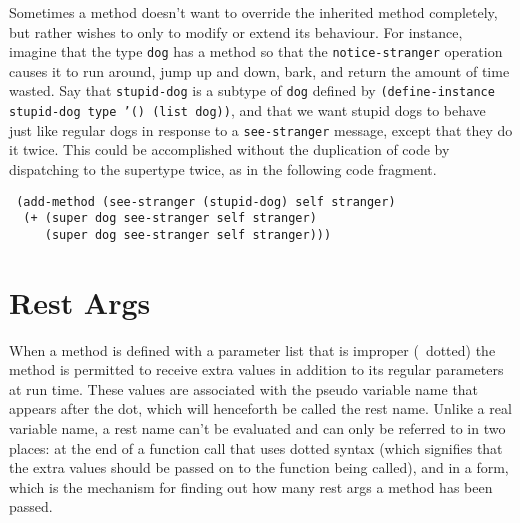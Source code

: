 Sometimes a method doesn't want to override the inherited method
completely, but rather wishes to only to modify or extend its
behaviour.  For instance, imagine that the type \texttt{dog} has a method
so that the \texttt{notice-stranger} operation causes it to run around,
jump up and down, bark, and return the amount of time wasted.  Say
that \texttt{stupid-dog} is a subtype of \texttt{dog} defined by
\texttt{(define-instance stupid-dog type '() (list dog))}, and that we
want stupid dogs to behave just like regular dogs in response to a
\texttt{see-stranger} message, except that they do it twice.  This could
be accomplished without the duplication of code by dispatching to the
supertype twice, as in the following code fragment.
\begin{flushleft}\tt
(add-method (see-stranger (stupid-dog) self stranger)\\
~~(+ ({\upar}super dog see-stranger self stranger)\\
~~~~~({\upar}super dog see-stranger self stranger)))
\end{flushleft}





\section{Rest Args}

When a method is defined with a parameter list that is improper (\ie\
dotted) the method is permitted to receive extra values in addition to
its regular parameters at run time.  These values are associated with
the pseudo variable name that appears after the dot, which will
henceforth be called the rest name.  Unlike a real variable name, a
rest name can't be evaluated and can only be referred to in two
places: at the end of a function call that uses dotted syntax (which
signifies that the extra values should be passed on to the function
being called), and in a \df{rest-length} form, which is the mechanism
for finding out how many rest args a method has been passed.

